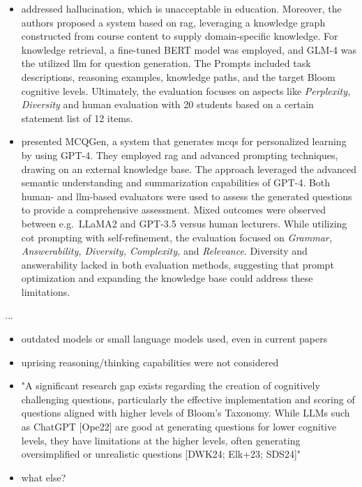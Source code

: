 \begin{itemize}
    \item \cite{yang_heuristic_2024} addressed hallucination, which is unacceptable in education. Moreover, the authors proposed a system based on \ac{rag}, leveraging a knowledge graph constructed from course content to supply domain-specific knowledge. For knowledge retrieval, a fine-tuned BERT model was employed, and GLM-4 \cite{glm_chatglm_2024} was the utilized \ac{llm} for question generation. The Prompts included task descriptions, reasoning examples, knowledge paths, and the target Bloom cognitive levels. Ultimately, the evaluation focuses on aspects like \textit{Perplexity, Diversity} and human evaluation with 20 students based on a certain statement list of 12 items.
    \item \cite{hang_mcqgen_2024} presented MCQGen, a system that generates \ac{mcqs} for personalized learning by using GPT-4. They employed \ac{rag} and advanced prompting techniques, drawing on an external knowledge base. The approach leveraged the advanced semantic understanding and summarization capabilities of GPT-4. Both human- and \ac{llm}-based evaluators were used to assess the generated questions to provide a comprehensive assessment. Mixed outcomes were observed between e.g.\ LLaMA2 and GPT-3.5 versus human lecturers. While utilizing \ac{cot} prompting with self-refinement, the evaluation focused on \textit{Grammar, Answerability, Diversity, Complexity,} and \textit{Relevance}. Diversity and answerability lacked in both evaluation methods, suggesting that prompt optimization and expanding the knowledge base could address these limitations. 
\end{itemize}

\vspace{3em}\pagebreak

 ...



\begin{itemize}
    \item outdated models or small language models used, even in current papers
    \item uprising reasoning/thinking capabilities were not considered
    \item "A significant research gap exists regarding the creation of
cognitively challenging questions, particularly the effective implementation and scoring of questions
aligned with higher levels of Bloom's Taxonomy. While LLMs such as ChatGPT [Ope22] are good
at generating questions for lower cognitive levels, they have limitations at the higher levels, often
generating oversimplified or unrealistic questions [DWK24; Elk+23; SDS24]"
    \item what else?
\end{itemize}